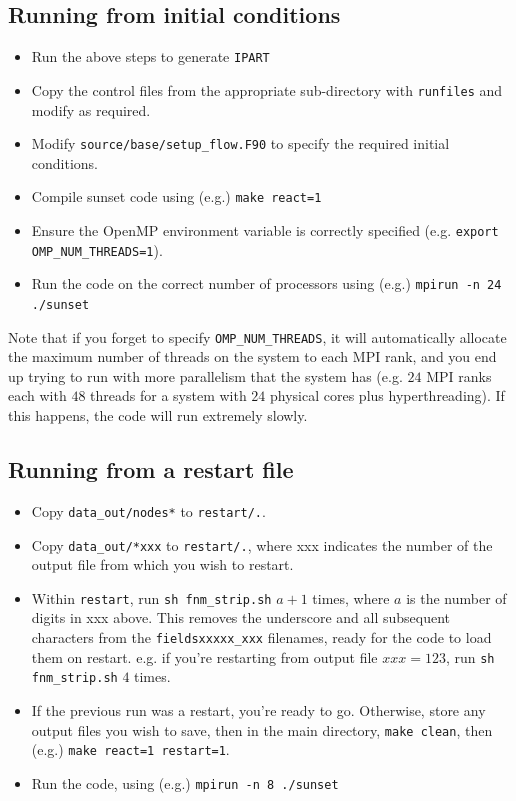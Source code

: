 \documentclass[notitlepage]{revtex4-1}
\begin{document}
\subsection{Running from initial conditions}

\begin{itemize}
\item Run the above steps to generate \verb|IPART|
\item Copy the control files from the appropriate sub-directory with \verb|runfiles| and modify as required.
\item Modify \verb|source/base/setup_flow.F90| to specify the required initial conditions.
\item Compile sunset code using (e.g.) \verb|make react=1|
\item Ensure the OpenMP environment variable is correctly specified (e.g. \verb|export OMP_NUM_THREADS=1|).
\item Run the code on the correct number of processors using (e.g.) \verb|mpirun -n 24 ./sunset|
\end{itemize}

Note that if you forget to specify \verb|OMP_NUM_THREADS|, it will automatically allocate the maximum number of threads on the system to each MPI rank, and you end up trying to run with more parallelism that the system has (e.g. $24$ MPI ranks each with $48$ threads for a system with $24$ physical cores plus hyperthreading). If this happens, the code will run extremely slowly.

\subsection{Running from a restart file}

\begin{itemize}
\item Copy \verb|data_out/nodes*| to \verb|restart/.|.
\item Copy \verb|data_out/*xxx| to \verb|restart/.|, where xxx indicates the number of the output file from which you wish to restart.
\item Within \verb|restart|, run \verb|sh fnm_strip.sh| $a+1$ times, where $a$ is the number of digits in xxx above. This removes the underscore and all subsequent characters from the \verb|fieldsxxxxx_xxx| filenames, ready for the code to load them on restart. e.g. if you're restarting from output file $xxx=123$, run \verb|sh fnm_strip.sh| $4$ times. 
\item If the previous run was a restart, you're ready to go. Otherwise, store any output files you wish to save, then in the main directory, \verb|make clean|, then (e.g.) \verb|make react=1 restart=1|.
\item Run the code, using (e.g.) \verb|mpirun -n 8 ./sunset|
\end{itemize}
\end{document}
